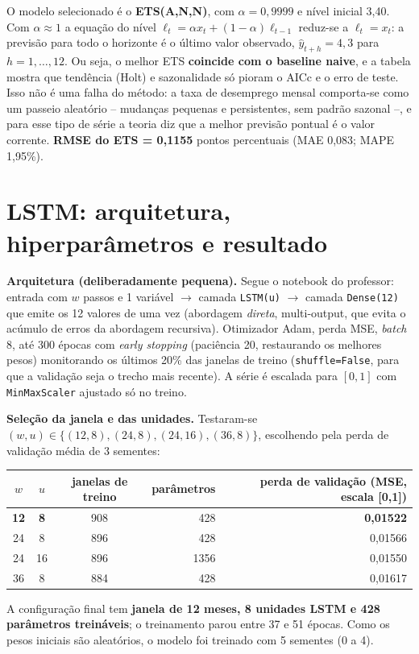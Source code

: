 \documentclass[11pt,a4paper]{article}
\begin{document}
\begin{resposta}[title={Resultado do ETS}]
O modelo selecionado é o \textbf{ETS(A,N,N)}, com $\alpha = 0{,}9999$ e nível inicial 3,40. Com $\alpha \approx 1$ a equação do nível $\ell_t = \alpha x_t + (1-\alpha)\ell_{t-1}$ reduz-se a $\ell_t = x_t$: a previsão para todo o horizonte é o último valor observado, $\hat y_{t+h} = 4{,}3$ para $h = 1,\dots,12$. Ou seja, o melhor ETS \textbf{coincide com o baseline naive}, e a tabela mostra que tendência (Holt) e sazonalidade só pioram o AICc e o erro de teste. Isso não é uma falha do método: a taxa de desemprego mensal comporta-se como um passeio aleatório -- mudanças pequenas e persistentes, sem padrão sazonal --, e para esse tipo de série a teoria diz que a melhor previsão pontual é o valor corrente. \textbf{RMSE do ETS = 0,1155} pontos percentuais (MAE 0,083; MAPE 1,95\%).
\end{resposta}

\section{LSTM: arquitetura, hiperparâmetros e resultado}
\begin{resposta}
\textbf{Arquitetura (deliberadamente pequena).} Segue o notebook do professor: entrada com $w$ passos e 1 variável $\rightarrow$ camada \texttt{LSTM(u)} $\rightarrow$ camada \texttt{Dense(12)} que emite os 12 valores de uma vez (abordagem \emph{direta}, multi-output, que evita o acúmulo de erros da abordagem recursiva). Otimizador Adam, perda MSE, \textit{batch} 8, até 300 épocas com \textit{early stopping} (paciência 20, restaurando os melhores pesos) monitorando os últimos 20\% das janelas de treino (\texttt{shuffle=False}, para que a validação seja o trecho mais recente). A série é escalada para $[0,1]$ com \texttt{MinMaxScaler} ajustado só no treino.

\textbf{Seleção da janela e das unidades.} Testaram-se $(w,u) \in \{(12,8), (24,8), (24,16), (36,8)\}$, escolhendo pela perda de validação média de 3 sementes:
\begin{center}\small
\begin{tabular}{@{}cccrr@{}}
\toprule
$w$ & $u$ & janelas de treino & parâmetros & perda de validação (MSE, escala [0,1]) \\
\midrule
\textbf{12} & \textbf{8} & 908 & 428 & \textbf{0,01522} \\
24 & 8 & 896 & 428 & 0,01566 \\
24 & 16 & 896 & 1356 & 0,01550 \\
36 & 8 & 884 & 428 & 0,01617 \\
\bottomrule
\end{tabular}
\end{center}
A configuração final tem \textbf{janela de 12 meses, 8 unidades LSTM e 428 parâmetros treináveis}; o treinamento parou entre 37 e 51 épocas. Como os pesos iniciais são aleatórios, o modelo foi treinado com 5 sementes (0 a 4).
\end{resposta}
\end{document}
